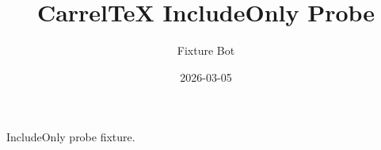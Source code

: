 \documentclass{article}
\title{CarrelTeX IncludeOnly Probe}
\author{Fixture Bot}
\date{2026-03-05}
\begin{document}
\maketitle

IncludeOnly probe fixture.
\end{document}
